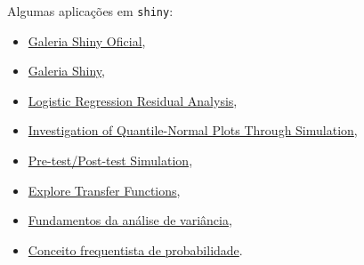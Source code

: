 \begin{frame}
  Algumas aplicações em \texttt{shiny}:
  \begin{itemize}
  \item \href{http://shiny.rstudio.com/gallery/}{Galeria Shiny Oficial},
  \item \href{http://www.showmeshiny.com/}{Galeria Shiny},
  \item \href{http://www.stat.cmu.edu:3838/hseltman/LogReg/}{Logistic
      Regression Residual Analysis},
  \item
    \href{https://hseltman.shinyapps.io/QuantileNormal}{Investigation of
      Quantile-Normal Plots Through Simulation},
  \item
    \href{http://www.stat.cmu.edu:3838/hseltman/PrePost/}{Pre-test/Post-test
      Simulation},
  \item
    \href{http://www.stat.cmu.edu:3838/hseltman/TransferFunctions/}{Explore
      Transfer Functions},
  \item
    \href{http://nbcgib.uesc.br/lec/avale-es/amb-virtual/inferencia/anava}{Fundamentos
      da análise de variância},
  \item
    \href{http://nbcgib.uesc.br/lec/avale-es/amb-virtual/probabilidade/con-frequentista}{Conceito
      frequentista de probabilidade}.
  \end{itemize}

\end{frame}
